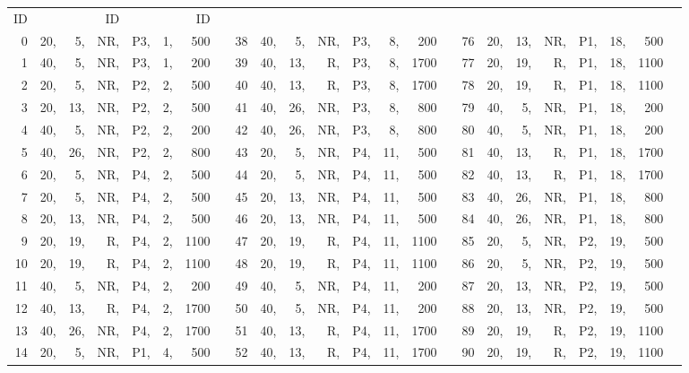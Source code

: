 \begin{table}
\begin{center}
\begin{scriptsize}
\begin{tabular}{*{3}{@{\hskip15pt}r|*{5}{r@{\hskip3pt}}rc}}
	ID&&&ID&&&ID&\\
													 													
   0&20,& 5,&NR,&P3,& 1,& 500&	& 	  38&40,& 5,&NR,&P3,& 8,& 200&	 &   	 76&20,&13,&NR,&P1,&18,& 500\\
   1&40,& 5,&NR,&P3,& 1,& 200&  &     39&40,&13,& R,&P3,& 8,&1700&   &     77&20,&19,& R,&P1,&18,&1100\\
   2&20,& 5,&NR,&P2,& 2,& 500&  &     40&40,&13,& R,&P3,& 8,&1700&   &     78&20,&19,& R,&P1,&18,&1100\\
   3&20,&13,&NR,&P2,& 2,& 500&  &     41&40,&26,&NR,&P3,& 8,& 800&   &     79&40,& 5,&NR,&P1,&18,& 200\\
   4&40,& 5,&NR,&P2,& 2,& 200&  &     42&40,&26,&NR,&P3,& 8,& 800&   &     80&40,& 5,&NR,&P1,&18,& 200\\
   5&40,&26,&NR,&P2,& 2,& 800&  &     43&20,& 5,&NR,&P4,&11,& 500&   &     81&40,&13,& R,&P1,&18,&1700\\
   6&20,& 5,&NR,&P4,& 2,& 500&  &     44&20,& 5,&NR,&P4,&11,& 500&   &     82&40,&13,& R,&P1,&18,&1700\\
   7&20,& 5,&NR,&P4,& 2,& 500&  &     45&20,&13,&NR,&P4,&11,& 500&   &     83&40,&26,&NR,&P1,&18,& 800\\
   8&20,&13,&NR,&P4,& 2,& 500&  &     46&20,&13,&NR,&P4,&11,& 500&   &     84&40,&26,&NR,&P1,&18,& 800\\
   9&20,&19,& R,&P4,& 2,&1100&  &     47&20,&19,& R,&P4,&11,&1100&   &     85&20,& 5,&NR,&P2,&19,& 500\\
  10&20,&19,& R,&P4,& 2,&1100&  &     48&20,&19,& R,&P4,&11,&1100&   &     86&20,& 5,&NR,&P2,&19,& 500\\
  11&40,& 5,&NR,&P4,& 2,& 200&  &     49&40,& 5,&NR,&P4,&11,& 200&   &     87&20,&13,&NR,&P2,&19,& 500\\
  12&40,&13,& R,&P4,& 2,&1700&  &     50&40,& 5,&NR,&P4,&11,& 200&   &     88&20,&13,&NR,&P2,&19,& 500\\
  13&40,&26,&NR,&P4,& 2,&1700&  &     51&40,&13,& R,&P4,&11,&1700&   &     89&20,&19,& R,&P2,&19,&1100\\
  14&20,& 5,&NR,&P1,& 4,& 500&  &     52&40,&13,& R,&P4,&11,&1700&   &     90&20,&19,& R,&P2,&19,&1100\\

\end{tabular}
\end{scriptsize}
\end{center}
\end{table}
